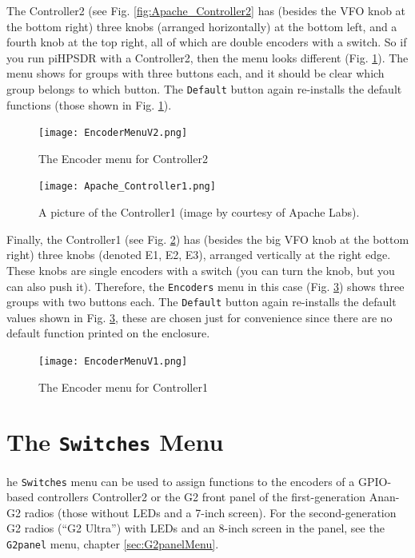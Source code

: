 \documentclass[12pt]{book}
\def\rett#1{\texttt{\color{red}#1}}
\def\bltt#1{\texttt{\color{blue}#1}}
\def\pH{pi\-HPSDR\xspace}
\begin{document}
The Controller2 (see Fig. \ref{fig:Apache_Controller2}
has (besides the VFO knob at the bottom right) three knobs (arranged horizontally) at the bottom left,
and a fourth knob at the top right, all of which are double encoders with a switch.
So if you run \pH with a Controller2, then the menu looks different (Fig. \ref{fig:EncoderMenuV2}).
The menu shows
for groups with three buttons each, and it should be clear which group belongs to which button. The
\rett{Default} button again re-installs the default functions (those shown in Fig. \ref{fig:EncoderMenuV2}).

\begin{figure}[ht!]
\center
\texttt{[image: EncoderMenuV2.png]}
\caption{The Encoder menu for Controller2}
\label{fig:EncoderMenuV2}
\end{figure}

\begin{figure}[ht!]
\center
\texttt{[image: Apache\_Controller1.png]}
\caption{A picture of the Controller1 (image by courtesy of Apache Labs).}
\label{fig:Apache_Controller1}
\end{figure}


Finally, the Controller1 (see Fig. \ref{fig:Apache_Controller1})
has (besides the big VFO knob at the bottom right)
three knobs (denoted E1, E2, E3), arranged vertically at the right edge. These knobs
are single encoders with a switch (you can turn the knob, but you can also push it). Therefore,
the \bltt{Encoders} menu in this case (Fig. \ref{fig:EncoderMenuV1}) shows three groups with
two buttons each. The \rett{Default} button again re-installs the default values shown in
Fig. \ref{fig:EncoderMenuV1}, these are chosen just for convenience since there are no default
function printed on the enclosure.

\begin{figure}[ht!]
\center
\texttt{[image: EncoderMenuV1.png]}
\caption{The Encoder menu for Controller1}
\label{fig:EncoderMenuV1}
\end{figure}

\clearpage
\section{The \texttt{Switches} Menu}

he \bltt{Switches} menu can be used to assign functions to the encoders of a
GPIO-based controllers Controller2 or the G2 front panel of the first-generation Anan-G2 radios
(those without LEDs and a 7-inch screen). For the second-generation G2 radios
(``G2 Ultra'') with LEDs and an 8-inch screen in the panel, see the \bltt{G2panel}
menu, chapter \ref{sec:G2panelMenu}.
\end{document}

